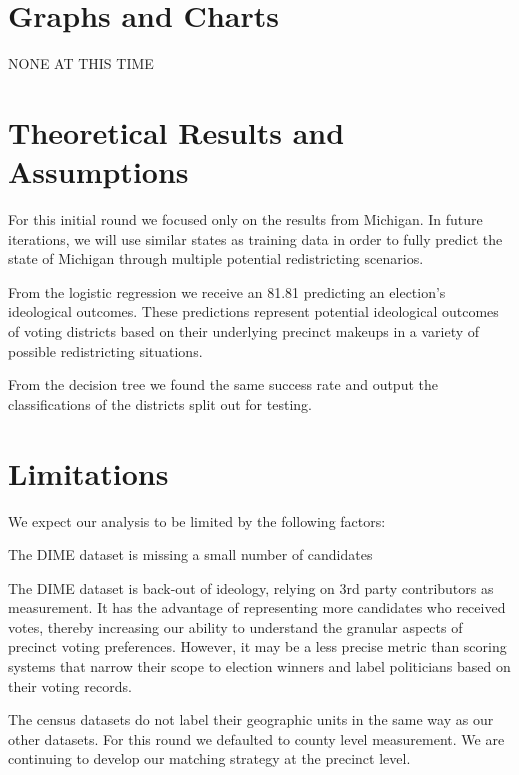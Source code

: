 \section{Graphs and Charts}


NONE AT THIS TIME


\section{Theoretical Results and Assumptions}

For this initial round we focused only on the results from Michigan. 
In future iterations, we will use similar states as training data
in order to fully predict the state of Michigan through multiple
potential redistricting scenarios.

From the logistic regression we receive an 81.81%
predicting an election's ideological outcomes. These predictions
represent potential ideological outcomes of voting districts
based on their underlying precinct makeups in a variety of possible
redistricting situations.

From the decision tree we found the same success rate and output
the classifications of the districts split out for testing.


\section{Limitations}


We expect our analysis to be limited by the following factors:

\item The DIME dataset is missing a small number of candidates

\item The DIME dataset is back-out of ideology, relying on 3rd
party contributors as measurement. It has the advantage of
representing more candidates who received votes, thereby increasing
our ability to understand the granular aspects of precinct voting
preferences. However, it may be a less precise metric than scoring
systems that narrow their scope to election winners and label
politicians based on their voting records.

\item The census datasets do not label their geographic units 
in the same way as our other datasets. For this round we defaulted
to county level measurement. We are continuing to develop our 
matching strategy at the precinct level.



